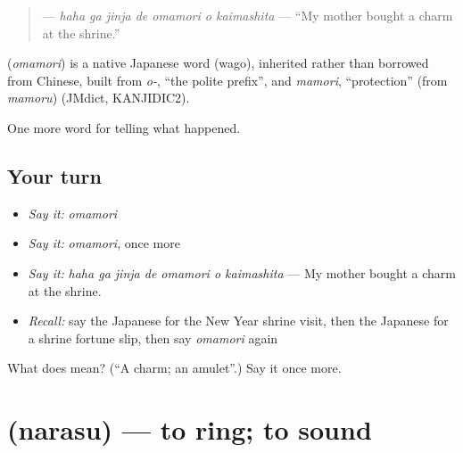 \begin{quote}
\textbf{   } — \emph{haha ga jinja de omamori o kaimashita} — \textquotedblleft{}My mother bought a charm at the shrine.\textquotedblright{}
\end{quote}

\begin{cousinweb}
\textbf{} (\emph{omamori}) is a native Japanese word (wago), inherited rather than borrowed from Chinese, built from \emph{o-}, \textquotedblleft{}the polite prefix\textquotedblright{}, and \emph{mamori}, \textquotedblleft{}protection\textquotedblright{} (from \emph{mamoru}) (JMdict, KANJIDIC2).
\end{cousinweb}

\begin{grammarlens}[title={What you've built}]
One more word for telling what happened.
\end{grammarlens}

\subsection*{Your turn}
\begin{itemize}
\raggedright
  \item \emph{Say it:} \emph{omamori}
  \item \emph{Say it:} \emph{omamori}, once more
  \item \emph{Say it:} \emph{haha ga jinja de omamori o kaimashita} — My mother bought a charm at the shrine.
  \item \emph{Recall:} say the Japanese for the New Year shrine visit, then the Japanese for a shrine fortune slip, then say \emph{omamori} again
\end{itemize}

\begin{tcolorbox}[breakable,colback=teal!4,colframe=teal!35!black,title={Before you move on}]
What does  mean? (\textquotedblleft{}A charm; an amulet\textquotedblright{}.) Say it once more.
\end{tcolorbox}
\section[\texorpdfstring{\ja{ならす} (narasu)}{ならす (narasu)}]{ (narasu) — to ring; to sound}

\label{lesson:JA-C295-narasu}



